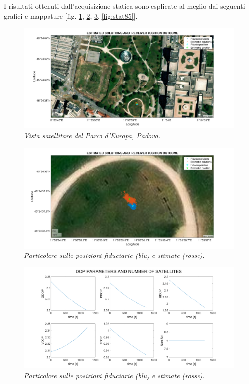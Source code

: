 \documentclass[a4paper,11pt,twoside]{book}
\begin{document}
	I risultati ottenuti dall'acquisizione statica sono esplicate al meglio dai seguenti grafici e mappature [fig. \ref{fig:stat821}, \ref{fig:stat822}, \ref{fig:stat83}, \ref{fig:stat85}].
	
	\begin{figure}[H]
		\centering
		\includegraphics[scale=0.30]{"Immagini workbook/Immagini esp8/stat821"}
		\caption{\textit{Vista satellitare del Parco d'Europa, Padova.}}
		\label{fig:stat821}
	\end{figure}
	
	\vspace{-0.5cm}
	
	\begin{figure}[H]
		\centering
		\includegraphics[scale=0.30]{"Immagini workbook/Immagini esp8/stat822"}
		\caption{\textit{Particolare sulle posizioni fiduciarie (blu) e stimate (rosse).}} 
		\label{fig:stat822}
	\end{figure}

	\begin{figure}[H]
		\centering
		\includegraphics[scale=0.30]{"Immagini workbook/Immagini esp8/stat83"}
		\caption{\textit{Particolare sulle posizioni fiduciarie (blu) e stimate (rosse).}} 
		\label{fig:stat83}
	\end{figure}
	
\end{document}
